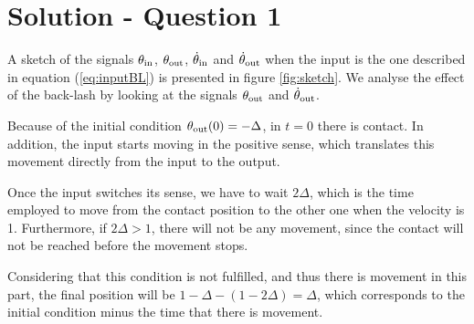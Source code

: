 \section*{Solution - Question 1}

A sketch of the signals $\operatorname{\theta_\textrm{in}}$, $\operatorname{\theta_\textrm{out}}$, $\operatorname{\dot{\theta}_\textrm{in}}$ and $\operatorname{\dot{\theta}_\textrm{out}}$ when the input is the one described in equation (\ref{eq:inputBL}) is presented in figure \ref{fig:sketch}. We analyse the effect of the back-lash by looking at the signals $\operatorname{\theta_\textrm{out}}$ and $\operatorname{\dot{\theta}_\textrm{out}}$.

Because of the initial condition $\operatorname{\theta_\textrm{out}}(0)=-\Delta$, in $t=0$ there is contact. In addition, the input starts moving in the positive sense, which translates this movement directly from the input to the output. 

Once the input switches its sense, we have to wait $2\Delta$, which is the time employed to move from the contact position to the other one when the velocity is 1. Furthermore, if $2\Delta > 1$, there will not be any movement, since the contact will not be reached before the movement stops. 

Considering that this condition is not fulfilled, and thus there is movement in this part, the final position will be $1-\Delta - (1-2\Delta) = \Delta$, which corresponds to the initial condition minus the time that there is movement.